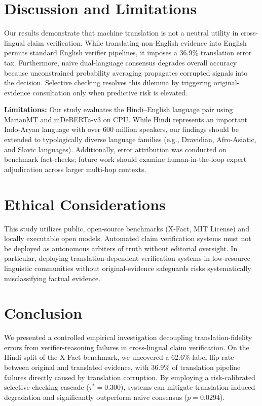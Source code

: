 \documentclass[11pt,a4paper]{article}
\begin{document}
\section{Discussion and Limitations}
\label{sec:discussion}

Our results demonstrate that machine translation is not a neutral utility in cross-lingual claim verification. While translating non-English evidence into English permits standard English verifier pipelines, it imposes a 36.9\% translation error tax. Furthermore, naive dual-language consensus degrades overall accuracy because unconstrained probability averaging propagates corrupted signals into the decision. Selective checking resolves this dilemma by triggering original-evidence consultation only when predictive risk is elevated.

\textbf{Limitations:} Our study evaluates the Hindi--English language pair using MarianMT and mDeBERTa-v3 on CPU. While Hindi represents an important Indo-Aryan language with over 600 million speakers, our findings should be extended to typologically diverse language families (e.g., Dravidian, Afro-Asiatic, and Slavic languages). Additionally, error attribution was conducted on benchmark fact-checks; future work should examine human-in-the-loop expert adjudication across larger multi-hop contexts.

\section{Ethical Considerations}
\label{sec:ethics}
This study utilizes public, open-source benchmarks (X-Fact, MIT License) and locally executable open models. Automated claim verification systems must not be deployed as autonomous arbiters of truth without editorial oversight. In particular, deploying translation-dependent verification systems in low-resource linguistic communities without original-evidence safeguards risks systematically misclassifying factual evidence.

\section{Conclusion}
\label{sec:conclusion}
We presented a controlled empirical investigation decoupling translation-fidelity errors from verifier-reasoning failures in cross-lingual claim verification. On the Hindi split of the X-Fact benchmark, we uncovered a 62.6\% label flip rate between original and translated evidence, with 36.9\% of translation pipeline failures directly caused by translation corruption. By employing a risk-calibrated selective checking cascade ($\tau^*=0.300$), systems can mitigate translation-induced degradation and significantly outperform naive consensus ($p = 0.0294$).
\end{document}
